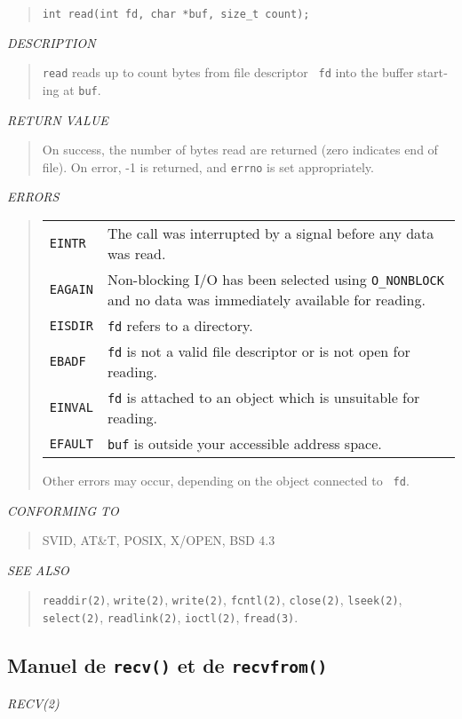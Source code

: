 \begin{appendix}
\begin{english}
\begin{quote}
\begin{verbatim}
int read(int fd, char *buf, size_t count);
\end{verbatim}
\end{quote}

{\sl DESCRIPTION}
\begin{quote}
	{\tt read} reads up to count bytes from file descriptor {\tt
	fd} into the buffer starting at {\tt buf}.
\end{quote}

{\sl RETURN VALUE}
\begin{quote}
	On success, the number of bytes read are returned (zero indicates
	end of file). On error, -1 is returned, and {\tt errno} is set
	appropriately.
\end{quote}

{\sl ERRORS}
\begin{quote}
\begin{tabular}{lp{8cm}}
	{\tt EINTR}		&	The call was interrupted by a signal before any
						data was read.\\
	{\tt EAGAIN}	&	Non-blocking I/O has been selected using
						{\tt O\_NONBLOCK} and no data was immediately
						available for reading.\\
	{\tt EISDIR}	&	{\tt fd} refers to a directory.\\
	{\tt EBADF}		&	{\tt fd} is not a valid file descriptor or is not open
						for reading.\\
	{\tt EINVAL}	&	{\tt fd} is attached to an object which is unsuitable
						for reading.\\
	{\tt EFAULT}	&	{\tt buf} is outside your accessible address space.\\
\end{tabular}
	Other errors may occur, depending on the object connected to {\tt
	fd}.
\end{quote}

{\sl CONFORMING TO}
\begin{quote}
	SVID, AT\&T, POSIX, X/OPEN, BSD 4.3
\end{quote}

{\sl SEE ALSO}
\begin{quote}
	{\tt readdir(2)}, {\tt write(2)}, {\tt write(2)}, {\tt fcntl(2)},
	{\tt close(2)}, {\tt lseek(2)}, {\tt select(2)}, {\tt readlink(2)},
	{\tt ioctl(2)}, {\tt fread(3)}.
\end{quote}
\end{english}

\subsection{Manuel de {\tt recv()} et de {\tt recvfrom()}}
\begin{english}
{\sl RECV(2)}\\


\end{english}
\end{appendix}
